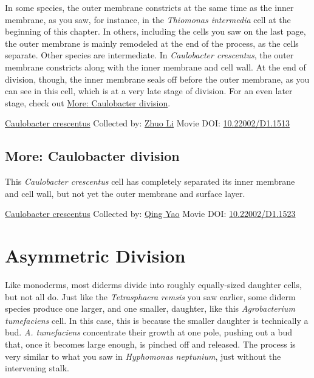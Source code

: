 \documentclass[]{tufte-book}
\begin{document}
In some species, the outer membrane constricts at the same time as the inner membrane, as you saw, for instance, in the \emph{Thiomonas intermedia} cell at the beginning of this chapter. In others, including the cells you saw on the last page, the outer membrane is mainly remodeled at the end of the process, as the cells separate. Other species are intermediate. In \emph{Caulobacter crescentus}, the outer membrane constricts along with the inner membrane and cell wall. At the end of division, though, the inner membrane seals off before the outer membrane, as you can see in this cell, which is at a very late stage of division. For an even later stage, check out \protect\hyperlink{Caulobacter_division}{More: Caulobacter division}.



\hypertarget{htmlwidget-dbbe06443982d6a79622}{}

\label{fig:5-7}\protect\hyperlink{tree}{Caulobacter crescentus} Collected by: \protect\hyperlink{zhuo_li}{Zhuo Li} Movie DOI: \href{https://doi.org/10.22002/D1.1513}{10.22002/D1.1513}

\hypertarget{Caulobacter_division}{%
\subsection*{More: Caulobacter division}\label{Caulobacter_division}}

This \emph{Caulobacter crescentus} cell has completely separated its inner membrane and cell wall, but not yet the outer membrane and surface layer.



\hypertarget{htmlwidget-287e75b237b826e68d65}{}

\label{fig:5-7a}\protect\hyperlink{tree}{Caulobacter crescentus} Collected by: \protect\hyperlink{qing_yao}{Qing Yao} Movie DOI: \href{https://doi.org/10.22002/D1.1523}{10.22002/D1.1523}

\hypertarget{asymmetric-division}{%
\section{Asymmetric Division}\label{asymmetric-division}}

Like monoderms, most diderms divide into roughly equally-sized daughter cells, but not all do. Just like the \emph{Tetrasphaera remsis} you saw earlier, some diderm species produce one larger, and one smaller, daughter, like this \emph{Agrobacterium tumefaciens} cell. In this case, this is because the smaller daughter is technically a bud. \emph{A. tumefaciens} concentrate their growth at one pole, pushing out a bud that, once it becomes large enough, is pinched off and released. The process is very similar to what you saw in \emph{Hyphomonas neptunium}, just without the intervening stalk.
\end{document}
